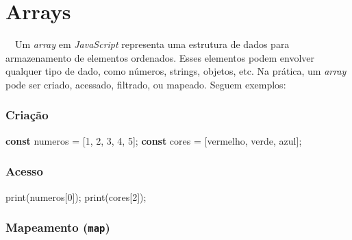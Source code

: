 \documentclass[
  portuguese,
  letterpaper,
  DIV=11,
  numbers=noendperiod]{scrreprt}
\newenvironment{Shaded}{\begin{snugshade}}{\end{snugshade}}
\newcommand{\DecValTok}[1]{\textcolor[rgb]{0.68,0.00,0.00}{#1}}
\newcommand{\FunctionTok}[1]{\textcolor[rgb]{0.28,0.35,0.67}{#1}}
\newcommand{\KeywordTok}[1]{\textcolor[rgb]{0.00,0.23,0.31}{\textbf{#1}}}
\newcommand{\NormalTok}[1]{\textcolor[rgb]{0.00,0.23,0.31}{#1}}
\newcommand{\OperatorTok}[1]{\textcolor[rgb]{0.37,0.37,0.37}{#1}}
\newcommand{\StringTok}[1]{\textcolor[rgb]{0.13,0.47,0.30}{#1}}
\begin{document}
\section{Arrays}\label{arrays}

~~Um \emph{array} em \emph{JavaScript} representa uma estrutura de dados
para armazenamento de elementos ordenados. Esses elementos podem
envolver qualquer tipo de dado, como números, strings, objetos, etc. Na
prática, um \emph{array} pode ser criado, acessado, filtrado, ou
mapeado. Seguem exemplos:

\subsubsection*{Criação}\label{criauxe7uxe3o}

\begin{Shaded}
\begin{Highlighting}[]
\KeywordTok{const}\NormalTok{ numeros }\OperatorTok{=}\NormalTok{ [}\DecValTok{1}\OperatorTok{,} \DecValTok{2}\OperatorTok{,} \DecValTok{3}\OperatorTok{,} \DecValTok{4}\OperatorTok{,} \DecValTok{5}\NormalTok{]}\OperatorTok{;}
\KeywordTok{const}\NormalTok{ cores }\OperatorTok{=}\NormalTok{ [}\StringTok{\textquotesingle{}vermelho\textquotesingle{}}\OperatorTok{,} \StringTok{\textquotesingle{}verde\textquotesingle{}}\OperatorTok{,} \StringTok{\textquotesingle{}azul\textquotesingle{}}\NormalTok{]}\OperatorTok{;}
\end{Highlighting}
\end{Shaded}

\subsubsection*{Acesso}\label{acesso}

\begin{Shaded}
\begin{Highlighting}[]
\FunctionTok{print}\NormalTok{(numeros[}\DecValTok{0}\NormalTok{])}\OperatorTok{;}
\FunctionTok{print}\NormalTok{(cores[}\DecValTok{2}\NormalTok{])}\OperatorTok{;}
\end{Highlighting}
\end{Shaded}

\subsubsection*{\texorpdfstring{Mapeamento
(\texttt{map})}{Mapeamento (map)}}\label{mapeamento-map}
\end{document}
